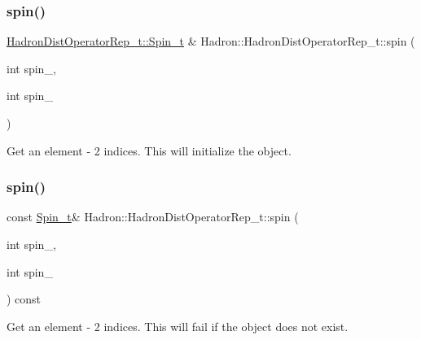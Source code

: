 \subsubsection{\texorpdfstring{spin()}{spin()}\hspace{0.1cm}{\footnotesize\ttfamily [2/16]}}
{\footnotesize\ttfamily \mbox{\hyperlink{structHadron_1_1HadronDistOperatorRep__t_1_1Spin__t}{Hadron\+Dist\+Operator\+Rep\+\_\+t\+::\+Spin\+\_\+t}} \& Hadron\+::\+Hadron\+Dist\+Operator\+Rep\+\_\+t\+::spin (\begin{DoxyParamCaption}\item[{int}]{spin\+\_,  }\item[{int}]{spin\+\_ }\end{DoxyParamCaption})}



Get an element -\/ 2 indices. This will initialize the object. 

\mbox{\label{classHadron_1_1HadronDistOperatorRep__t_afdd74c5a5f53f24a68bb544e4f8027f0}} 
\subsubsection{\texorpdfstring{spin()}{spin()}\hspace{0.1cm}{\footnotesize\ttfamily [3/16]}}
{\footnotesize\ttfamily const \mbox{\hyperlink{structHadron_1_1HadronDistOperatorRep__t_1_1Spin__t}{Spin\+\_\+t}}\& Hadron\+::\+Hadron\+Dist\+Operator\+Rep\+\_\+t\+::spin (\begin{DoxyParamCaption}\item[{int}]{spin\+\_,  }\item[{int}]{spin\+\_ }\end{DoxyParamCaption}) const}



Get an element -\/ 2 indices. This will fail if the object does not exist. 

\mbox{\label{classHadron_1_1HadronDistOperatorRep__t_a6d2afd90c11aaf4fcbac9bd8091f61a2}} 
